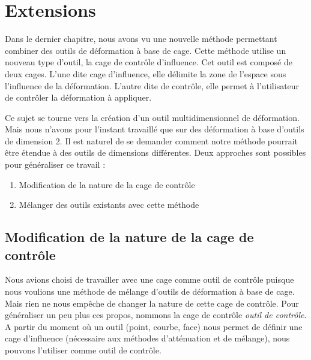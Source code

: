 

\chapter{Extensions}

\graphicspath{ {Chapter4/Chapter4Figs/PNG/}
  {Chapter4/Chapter4Figs/PDF/} {Chapter4/Chapter4Figs/} }

Dans le dernier chapitre, nous avons vu une nouvelle méthode permettant
combiner des outils de déformation à base de cage. Cette méthode utilise un
nouveau type d'outil, la cage de contrôle d'influence. Cet outil est composé
de deux cages. L'une dite cage d'influence, elle délimite la zone de l'espace
sous l'influence de la déformation. L'autre dite de contrôle, elle permet à
l'utilisateur de contrôler la déformation à appliquer.

Ce sujet se tourne vers la création d'un outil multidimensionnel de
déformation. Mais nous n'avons pour l'instant travaillé que sur des
déformation à base d'outils de dimension 2. Il est naturel de se demander
comment notre méthode pourrait être étendue à des outils de dimensions
différentes. Deux approches sont possibles pour généraliser ce travail :

\begin{enumerate}
\item Modification de la nature de la cage de contrôle
\item Mélanger des outils existants avec cette méthode
\end{enumerate}

\section{Modification de la nature de la cage de contrôle}

Nous avions choisi de travailler avec une cage comme outil de contrôle puisque
nous voulions une méthode de mélange d'outils de déformation à base de cage.
Mais rien ne nous empêche de changer la nature de cette cage de contrôle. Pour
généraliser un peu plus ces propos, nommons la cage de contrôle \textit{outil
de contrôle}. A partir du moment où un outil (point, courbe, face) nous permet
de définir une cage d'influence (nécessaire aux méthodes d'atténuation et de
mélange), nous pouvons l'utiliser comme outil de contrôle.

